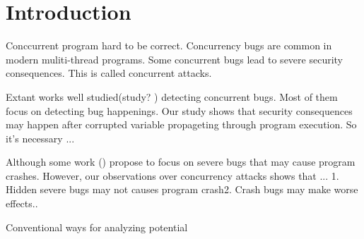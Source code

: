 \section{Introduction} \label{sec:intro}


Conccurrent program hard to be correct. Concurrency bugs are common in modern muliti-thread programs. 
Some concurrent bugs lead to severe security consequences. This is called concurrent attacks.


Extant works well studied(study? ) detecting concurrent bugs. Most of them focus on detecting 
bug happenings. Our study shows that security consequences may happen after corrupted variable 
propageting through program execution. So it's necessary ...

Although some work (\conmem) propose to focus on severe bugs that may cause program crashes. 
However, our observations over \observenum concurrency attacks shows that ... 1. Hidden severe bugs may not causes program crash2. Crash bugs may make worse effects..






Conventional ways for analyzing potential 




